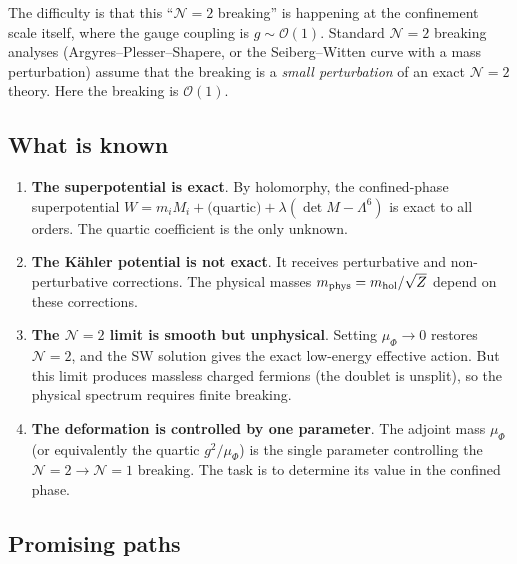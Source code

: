 \documentclass[12pt,a4paper]{article}
\begin{document}
The difficulty is that this ``$\mathcal{N}{=}2$ breaking'' is
happening at the confinement scale itself, where the gauge coupling is
$g \sim \mathcal{O}(1)$.  Standard $\mathcal{N}{=}2$ breaking analyses
(Argyres--Plesser--Shapere, or the Seiberg--Witten curve with a mass
perturbation) assume that the breaking is a \emph{small perturbation}
of an exact $\mathcal{N}{=}2$ theory.  Here the breaking is
$\mathcal{O}(1)$.

\subsection{What is known}

\begin{enumerate}
\item \textbf{The superpotential is exact}.  By holomorphy, the
  confined-phase superpotential
  $W = m_i M_i + \text{(quartic)} + \lambda(\det M - \Lambda^6)$
  is exact to all orders.  The quartic coefficient is the only
  unknown.

\item \textbf{The K\"ahler potential is not exact}.
  It receives perturbative and non-perturbative corrections.
  The physical masses $m_{\rm phys} = m_{\rm hol}/\sqrt{Z}$ depend on
  these corrections.

\item \textbf{The $\mathcal{N}{=}2$ limit is smooth but unphysical}.
  Setting $\mu_\Phi \to 0$ restores $\mathcal{N}{=}2$, and the SW
  solution gives the exact low-energy effective action.  But this limit
  produces massless charged fermions (the doublet is unsplit), so the
  physical spectrum requires finite breaking.

\item \textbf{The deformation is controlled by one parameter}.
  The adjoint mass $\mu_\Phi$ (or equivalently the quartic
  $g^2/\mu_\Phi$) is the single parameter controlling the
  $\mathcal{N}{=}2 \to \mathcal{N}{=}1$ breaking.  The task is to
  determine its value in the confined phase.
\end{enumerate}

\subsection{Promising paths}
\end{document}
